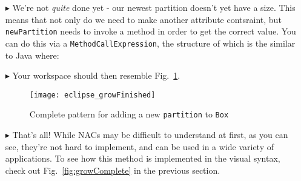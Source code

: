 \begin{itemize}
\clearpage

\item[$\blacktriangleright$] We're not \emph{quite} done yet - our newest partition doesn't yet have a size. This means that not only do we need to make
another attribute contsraint, but \texttt{newPartition} needs to invoke a method in order to get the correct value. You can do this via a
\texttt{MethodCallExpression}, the structure of which is the similar to Java where:


\item[$\blacktriangleright$] Your workspace should then resemble Fig.~\ref{fig:patternComplete}.

\begin{figure}[htp]
\begin{center}
  \texttt{[image: eclipse\_growFinished]}
  \caption{Complete pattern for adding a new \texttt{partition} to \texttt{Box} \update}
  \label{fig:patternComplete}
\end{center}
\end{figure}

\vspace{0.5cm}

\item[$\blacktriangleright$] That's all! While NACs may be difficult to understand at first, as you can see, they're not hard to implement, and
can be used in a wide variety of applications. To see how this method is implemented in the visual syntax, check out Fig.~\ref{fig:growComplete} in the
previous section.

\end{itemize}